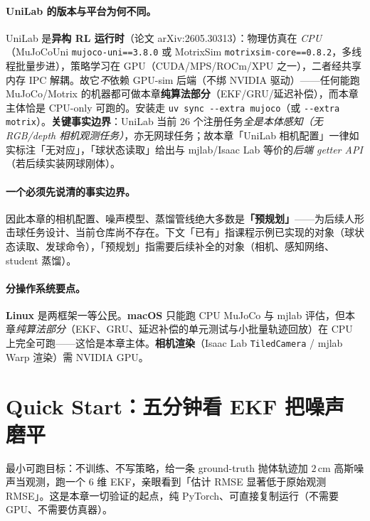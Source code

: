 \paragraph{UniLab 的版本与平台为何不同。}UniLab 是\textbf{异构 RL 运行时}（论文 arXiv:2605.30313）：物理仿真在 \emph{CPU}（MuJoCoUni \texttt{mujoco-uni==3.8.0} 或 MotrixSim \texttt{motrixsim-core==0.8.2}，多线程批量步进），策略学习在 GPU（CUDA/MPS/ROCm/XPU 之一），二者经共享内存 IPC 解耦。故它\emph{不}依赖 GPU-sim 后端（不绑 NVIDIA 驱动）——任何能跑 MuJoCo/Motrix 的机器都可做本章\textbf{纯算法部分}（EKF/GRU/延迟补偿），而本章主体恰是 CPU-only 可跑的。安装走 \verb|uv sync --extra mujoco|（或 \verb|--extra motrix|）。\textbf{关键事实边界}：UniLab 当前 $26$ 个注册任务\emph{全是本体感知（无 RGB/depth 相机观测任务）}，亦无网球任务；故本章「UniLab 相机配置」一律如实标注「无对应」，「球状态读取」给出与 mjlab/Isaac Lab 等价的\emph{后端 getter API}（若后续实装网球刚体）。

\paragraph{一个必须先说清的事实边界。}因此本章的相机配置、噪声模型、蒸馏管线绝大多数是\textbf{「预规划」}——为后续人形击球任务设计、当前仓库尚不存在。下文「已有」指课程示例已实现的对象（球状态读取、发球命令），「预规划」指需要后续补全的对象（相机、感知网络、student 蒸馏）。

\paragraph{分操作系统要点。}\textbf{Linux} 是两框架一等公民。\textbf{macOS} 只能跑 CPU MuJoCo 与 mjlab 评估，但本章\emph{纯算法部分}（EKF、GRU、延迟补偿的单元测试与小批量轨迹回放）在 CPU 上完全可跑——这恰是本章主体。\textbf{相机渲染}（Isaac Lab \verb|TiledCamera| / mjlab Warp 渲染）需 NVIDIA GPU。

\section*{Quick Start：五分钟看 EKF 把噪声磨平}
\label{sec:rlmc-perc-quickstart}

最小可跑目标：不训练、不写策略，给一条 ground-truth 抛体轨迹加 $2$\,cm 高斯噪声当观测，跑一个 $6$ 维 EKF，亲眼看到「估计 RMSE 显著低于原始观测 RMSE」。这是本章一切验证的起点，纯 PyTorch、可直接复制运行（不需要 GPU、不需要仿真器）。

